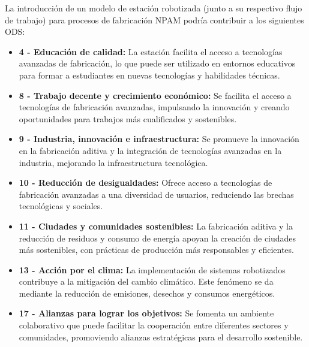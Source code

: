 La introducción de un modelo de estación robotizada (junto a su respectivo flujo de trabajo) para procesos de fabricación \acrshort{NPAM} podría contribuir a los siguientes ODS:

\begin{itemize}
    \item \textbf{4 - Educación de calidad:} La estación facilita el acceso a tecnologías avanzadas de fabricación, lo que puede ser utilizado en entornos educativos para formar a estudiantes en nuevas tecnologías y habilidades técnicas.
    \item \textbf{8 - Trabajo decente y crecimiento económico:} Se facilita el acceso a tecnologías de fabricación avanzadas, impulsando la innovación y creando oportunidades para trabajos más cualificados y sostenibles.
    \item \textbf{9 - Industria, innovación e infraestructura:} Se promueve la innovación en la fabricación aditiva y la integración de tecnologías avanzadas en la industria, mejorando la infraestructura tecnológica.
    \item \textbf{10 - Reducción de desigualdades:} Ofrece acceso a tecnologías de fabricación avanzadas a una diversidad de usuarios, reduciendo las brechas tecnológicas y sociales.
    \item \textbf{11 - Ciudades y comunidades sostenibles:} La fabricación aditiva y la reducción de residuos y consumo de energía apoyan la creación de ciudades más sostenibles, con prácticas de producción más responsables y eficientes.
    \item \textbf{13 - Acción por el clima:} La implementación de sistemas robotizados contribuye a la mitigación del cambio climático. Este fenómeno se da mediante la reducción de emisiones, desechos y consumos energéticos.
    \item \textbf{17 - Alianzas para lograr los objetivos:} Se fomenta un ambiente colaborativo que puede facilitar la cooperación entre diferentes sectores y comunidades, promoviendo alianzas estratégicas para el desarrollo sostenible.
\end{itemize}



